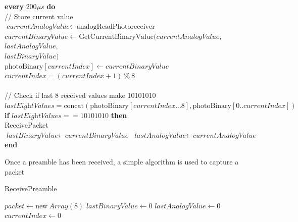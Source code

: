 \documentclass[letterpaper,10pt]{article}
\begin{document}
\begin{spacing}{1.15}
\begin{algorithm}[H]
\begin{algorithmic}[1]
		\State \textbf{every} $200 \mu s$ \textbf{do}\\
		\quad // Store current value\\
		\quad $\textit{currentAnalogValue} \gets \text{analogReadPhotoreceiver}$\\
		\quad $\textit{currentBinaryValue} \gets \text{GetCurrentBinaryValue}(\textit{currentAnalogValue},$\\ 
		\hspace{7.65cm} $\textit{lastAnalogValue},$\\
		\hspace{7.65cm} $\textit{lastBinaryValue})$ \\
		\quad $\text{photoBinary}[\textit{currentIndex}] \gets \textit{currentBinaryValue}$\\
		\quad $\textit{currentIndex} = (\textit{currentIndex} + 1)\ \%\ 8$\\\\
		
		\quad // Check if last 8 received values make 10101010 
		\State \quad $\textit{lastEightValues} = \text{concat}(\text{photoBinary}[\textit{currentIndex}...8],\text{photoBinary}[0..\textit{currentIndex}])$ \\
		\quad \textbf{if} $\textit{lastEightValues} == 10101010$ \textbf{then}\\
		\quad \quad ReceivePacket\\
		
		\State \quad $\textit{lastBinaryValue} \gets \textit{currentBinaryValue}$
		\State \quad $\textit{lastAnalogValue} \gets \textit{currentAnalogValue}$
		\State \textbf{end}		
	\end{algorithmic}
\end{algorithm}

Once a preamble has been received, a simple algorithm is used to capture a packet
\begin{algorithm}[H]
	\caption{ReceivePreamble}\label{euclid}
	\begin{algorithmic}[1]
		\State $\textit{packet} \gets \text{new}\ \textit{Array}(8)$
		\State $\textit{lastBinaryValue} \gets 0$
		\State $\textit{lastAnalogValue} \gets 0$
		\State $currentIndex \gets 0$\\
		

\end{algorithmic}
\end{algorithm}
\end{spacing}
\end{document}
